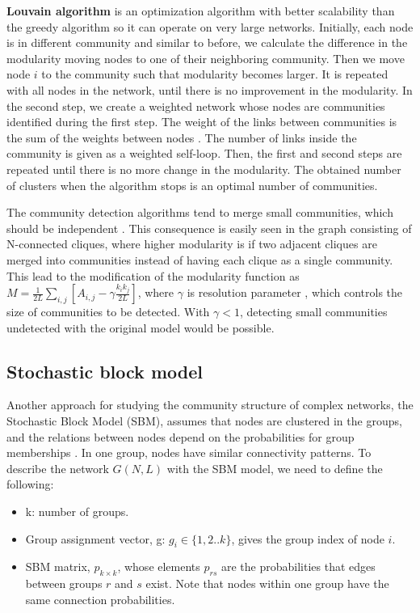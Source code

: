 \textbf{Louvain algorithm} \cite{blondel2008fast} is an optimization algorithm with better scalability than the greedy algorithm so it can operate on very large networks. Initially, each node is in different community%
and similar to before, we calculate the difference in the modularity moving nodes to one of their neighboring community. Then we move node $i$ to the community such that modularity becomes larger. It is repeated with all nodes in the network, until there is no improvement in the modularity. In the second step, we create a weighted network whose nodes are communities identified during the first step. The weight of the links between communities is the sum of the weights between nodes \cite{barabasi2014network}. The number of links inside the community is given as a weighted self-loop. Then, the first and second steps are repeated until there is no more change in the modularity. The obtained number of clusters when the algorithm stops is an optimal number of communities. 

The community detection algorithms tend to merge small communities, which should be independent \cite{fortunato2007resolution}. This consequence is easily seen in the graph consisting of N-connected cliques, where higher modularity is if two adjacent cliques are merged into communities instead of having each clique as a single community. This lead to the modification of the modularity function as $M= \frac{1}{2L}\sum_{i,j}[A_{i,j} - \gamma \frac{k_ik_j}{2L}]$, where $\gamma$ is resolution parameter \cite{reichardt2006statistical}, which controls the size of communities to be detected. With $\gamma<1$, detecting small communities undetected with the original model would be possible. 

\subsection{Stochastic block model}

Another approach for studying the community structure of complex networks, the Stochastic Block Model (SBM), assumes that nodes are clustered in the groups, and the relations between nodes depend on the probabilities for group memberships \cite{lee2019review}. In one group, nodes have similar connectivity patterns. To describe the network $G(N, L)$ with the SBM model, we need to define the following:

\begin{itemize}
	\item k: number of groups.
	\item Group assignment vector, g: $g_i \in\{1,2..k\}$, gives the group index of node $i$.
	\item SBM matrix, $p_{k \times k}$, whose elements $p_{rs}$ are the probabilities that edges between groups $r$ and $s$ exist. Note that nodes within one group have the same connection probabilities. 
\end{itemize}

